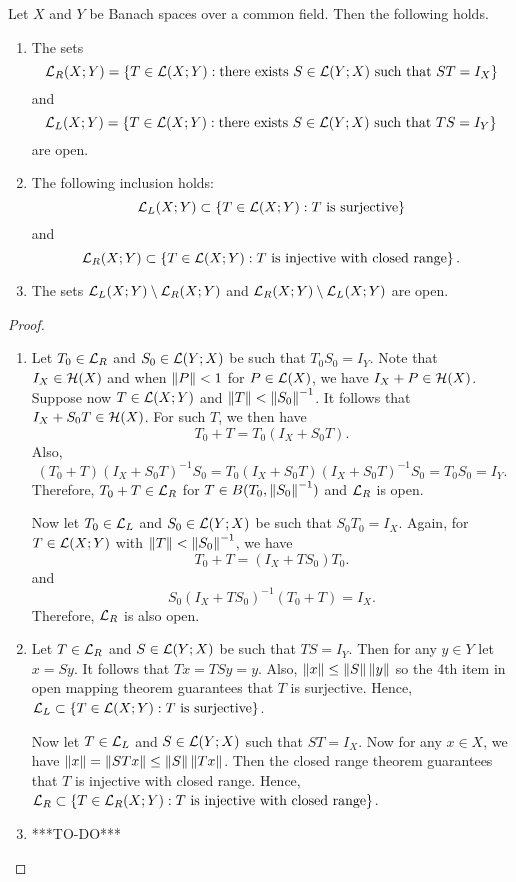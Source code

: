 \documentclass[a4paper]{article}
\begin{document}
\begin{thm}
Let $X$ and $Y$ be Banach spaces over a common field. Then the following holds.
\begin{enumerate}
\item The sets 
\[
\mathcal{L}_R(X; Y) = \left\{ T \in \mathcal{L}(X; Y) : \text{there exists $S \in \mathcal{L}(Y; X)$ such that $ST = I_X$} \right\}
\]
and 
\[
\mathcal{L}_L(X; Y) = \left\{ T \in \mathcal{L}(X; Y) : \text{there exists $S \in \mathcal{L}(Y; X)$ such that $TS = I_Y$} \right\}
\]
are open.
\item The following inclusion holds: 
\[
\mathcal{L}_L(X; Y) \subset \left\{ T \in \mathcal{L}(X; Y) : \text{$T$ is surjective} \right\}
\]
and 
\[
\mathcal{L}_R(X; Y) \subset \left\{ T \in \mathcal{L}(X; Y) : \text{$T$ is injective with closed range} \right\}.
\]
\item The sets $\mathcal{L}_L(X; Y) \setminus \mathcal{L}_R(X; Y)$ and $\mathcal{L}_R(X; Y) \setminus \mathcal{L}_L(X; Y)$ are open.
\end{enumerate}
\end{thm}

\begin{proof}
\begin{enumerate}
\item Let $T_0 \in \mathcal{L}_R$ and $S_0 \in \mathcal{L}(Y; X)$ be such that 
$T_0 S_0 = I_Y$. Note that $I_X \in \mathcal{H}(X)$ and when $\left\lVert P\right\rVert < 1$
for $P \in \mathcal{L}(X)$, we have $I_X + P \in \mathcal{H}(X)$. Suppose now 
$T \in \mathcal{L}(X; Y)$ and $\left\lVert T\right\rVert < \left\lVert S_0\right\rVert^{-1}$. It follows that 
$I_X + S_0 T \in \mathcal{H}(X)$. For such $T$, we then have 
\[
T_0 + T = T_0 (I_X + S_0 T).
\]
Also, 
\[
(T_0 + T) (I_X + S_0 T)^{-1} S_0 = T_0 (I_X + S_0 T) (I_X + S_0 T)^{-1} S_0
= T_0 S_0 = I_Y.
\]
Therefore, $T_0 + T \in \mathcal{L}_R$ for $T \in B(T_0, \left\lVert S_0\right\rVert^{-1})$ 
and $\mathcal{L}_R$ is open.

Now let $T_0 \in \mathcal{L}_L$ and $S_0 \in \mathcal{L}(Y; X)$ be such that 
$S_0 T_0 = I_X$. Again, for $T \in \mathcal{L}(X; Y)$ with 
$\left\lVert T\right\rVert < \left\lVert S_0\right\rVert^{-1}$, we have 
\[
T_0 + T = (I_X + T S_0) T_0.
\]
and 
\[
S_0 (I_X + T S_0)^{-1} (T_0 + T) = I_X.
\]
Therefore, $\mathcal{L}_R$ is also open.

\item Let $T \in \mathcal{L}_R$ and $S \in \mathcal{L}(Y; X)$ be such that 
$TS = I_Y$. Then for any $y \in Y$ let $x = Sy$. It follows 
that $Tx = TSy = y$. Also, $\left\lVert x\right\rVert \leq \left\lVert S\right\rVert \left\lVert y\right\rVert$
so the 4th item in open mapping theorem guarantees that $T$ is 
surjective. Hence, $\mathcal{L}_L \subset \left\{ T \in \mathcal{L}(X; Y) :  
\text{$T$ is surjective}\right\}$.

Now let $T \in \mathcal{L}_L$ and $S \in \mathcal{L}(Y; X)$ such that 
$ST = I_X$. Now for any $x \in X$, we have $\left\lVert x\right\rVert 
= \left\lVert STx\right\rVert \leq \left\lVert S\right\rVert \left\lVert Tx\right\rVert$. Then the closed 
range theorem guarantees that $T$ is injective with closed 
range. Hence, $\mathcal{L}_R \subset \left\{ T \in \mathcal{L}_R(X; Y) : 
\text{$T$ is injective with closed range} \right\}$.

\item ***TO-DO***
\end{enumerate}
\end{proof}
\end{document}
